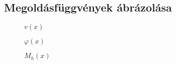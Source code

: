 \documentclass[a4paper, 12pt]{scrartcl}
\begin{document}
\clearpage
\subsection{Megoldásfüggvények ábrázolása} %
\label{sub:Megoldásfüggvények ábrázolása}

\begin{figure}[H]
  \centering
  
  \caption{$v(x)$}
  \label{fig:plot-v}
\end{figure}

\begin{figure}[H]
  \centering
  
  \caption{$\varphi(x)$}
  \label{fig:plot-phi}
\end{figure}

\begin{figure}[H]
  \centering
  
  \caption{$M_h(x)$}
  \label{fig:plot-Mh}
\end{figure}





\end{document}
